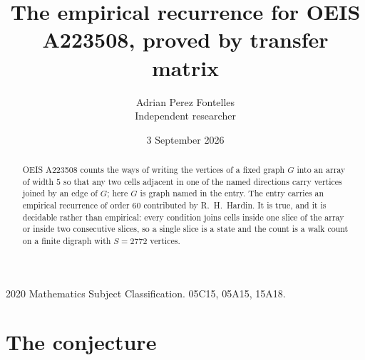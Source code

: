 \documentclass[11pt,a4paper]{article}
\title{The empirical recurrence for OEIS A223508, proved by transfer matrix}
\author{Adrian Perez Fontelles\\ \small Independent researcher}
\date{3 September 2026}
\theoremstyle{plain}
\theoremstyle{definition}
\begin{document}
\maketitle

\begin{abstract}
OEIS A223508 counts the ways of writing the vertices of a fixed graph $G$ into an array of width
$5$ so that any two cells adjacent in one of the named directions carry vertices joined by an
edge of $G$; here $G$ is graph named in the entry. The entry carries an empirical recurrence of order $60$
contributed by R.~H.~Hardin. It is true, and it is decidable rather than empirical: every
condition joins cells inside one slice of the array or inside two consecutive slices, so a
single slice is a state and the count is a walk count on a finite digraph with $S=2772$ vertices.
\end{abstract}

\noindent\small 2020 Mathematics Subject Classification. 05C15, 05A15, 15A18.\normalsize

\section{The conjecture}
\end{document}
